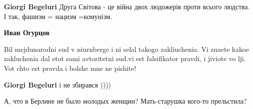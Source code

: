 \begin{itemize}
\begin{itemize}
\begin{itemize} %
\textbf{Giorgi Begeluri} Друга Світова - це війна двох людожерів проти всього людства. І так, фашизм = нацизм =комунізм.

\textbf{Иван Огурцов}

Bil mejdunarodni sud v niurnberge i ni selal takogo zakliuchenia. Vi znaete
kakoe zakluchenia dal etot sami avtoritetni sud.vi est falsifikator pravdi, i
jiviote vo lji. Vot chto est pravda i bolshe mne ne pishite!

\textbf{Giorgi Begeluri} і не збирався ))))

\end{itemize} %

А, что в Берлине не было молодых женщин? Мать-старушка кого-то прельстила?
\end{itemize} %

\end{itemize} %
